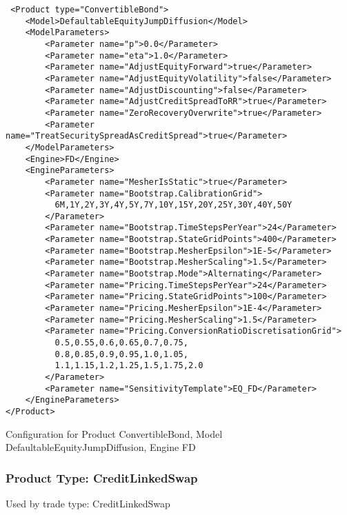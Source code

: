 \begin{longlisting}
\begin{verbatim}
 <Product type="ConvertibleBond">
    <Model>DefaultableEquityJumpDiffusion</Model>
    <ModelParameters>
        <Parameter name="p">0.0</Parameter>
        <Parameter name="eta">1.0</Parameter>
        <Parameter name="AdjustEquityForward">true</Parameter>
        <Parameter name="AdjustEquityVolatility">false</Parameter>
        <Parameter name="AdjustDiscounting">false</Parameter>
        <Parameter name="AdjustCreditSpreadToRR">true</Parameter>
        <Parameter name="ZeroRecoveryOverwrite">true</Parameter>
        <Parameter name="TreatSecuritySpreadAsCreditSpread">true</Parameter>
    </ModelParameters>
    <Engine>FD</Engine>
    <EngineParameters>
        <Parameter name="MesherIsStatic">true</Parameter>
        <Parameter name="Bootstrap.CalibrationGrid">
          6M,1Y,2Y,3Y,4Y,5Y,7Y,10Y,15Y,20Y,25Y,30Y,40Y,50Y
        </Parameter>
        <Parameter name="Bootstrap.TimeStepsPerYear">24</Parameter>
        <Parameter name="Bootstrap.StateGridPoints">400</Parameter>
        <Parameter name="Bootstrap.MesherEpsilon">1E-5</Parameter>
        <Parameter name="Bootstrap.MesherScaling">1.5</Parameter>
        <Parameter name="Bootstrap.Mode">Alternating</Parameter>
        <Parameter name="Pricing.TimeStepsPerYear">24</Parameter>
        <Parameter name="Pricing.StateGridPoints">100</Parameter>
        <Parameter name="Pricing.MesherEpsilon">1E-4</Parameter>
        <Parameter name="Pricing.MesherScaling">1.5</Parameter>
        <Parameter name="Pricing.ConversionRatioDiscretisationGrid">
          0.5,0.55,0.6,0.65,0.7,0.75,
          0.8,0.85,0.9,0.95,1.0,1.05,
          1.1,1.15,1.2,1.25,1.5,1.75,2.0
        </Parameter>
        <Parameter name="SensitivityTemplate">EQ_FD</Parameter>
    </EngineParameters>
</Product>
\end{verbatim}
\caption{Configuration for Product ConvertibleBond, Model DefaultableEquityJumpDiffusion, Engine FD}
\label{lst:peconfig_ConvertibleBond_DefaultableEquityJumpDiffusion_FD}
\end{longlisting}

\subsubsection{Product Type: CreditLinkedSwap}

Used by trade type: CreditLinkedSwap

